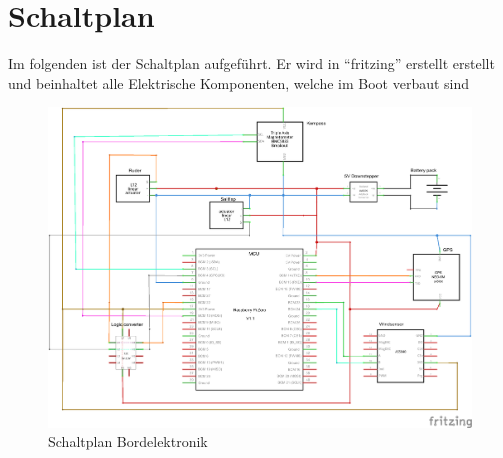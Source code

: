 \chapter{Schaltplan}
\label{appendix:schaltplan}
Im folgenden ist der Schaltplan aufgeführt. Er wird in \enquote{fritzing} erstellt erstellt und beinhaltet alle Elektrische Komponenten, welche im Boot verbaut sind

\begin{figure}[H]
    \centering
    \includegraphics[angle=90,width=\textwidth,height=\textheight,keepaspectratio]{assets/Boat Electronics6_Schaltplan.png}
    \caption{Schaltplan Bordelektronik}
\end{figure}
